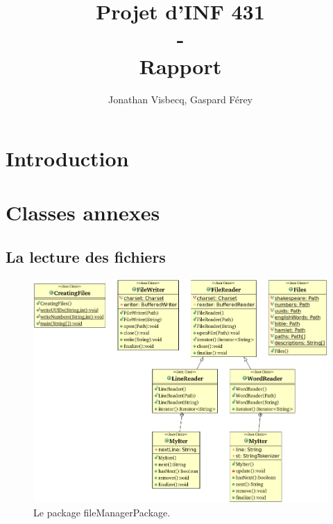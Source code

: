 \documentclass[12pt,a4paper,titlepage]{article}
\author{Jonathan Visbecq, Gaspard Férey}
\title{Projet d'INF 431 \\ - \\ Rapport}
\begin{document}
\maketitle

\section*{Introduction}

\section*{Classes annexes}

\subsection*{La lecture des fichiers}

\begin{figure}
	\label{fig:fileManagerPackage}
	\centering
	\includegraphics[scale=0.65, angle=90]{../Java Workspace/Test Hash/fileManagerPackage.png}
	\caption{Le package fileManagerPackage.}
\end{figure}
\end{document}
